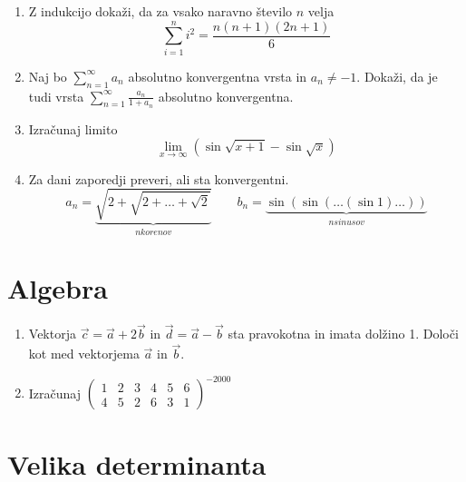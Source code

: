 \documentclass[a4paper,12pt]{article}
\begin{document}
\begin{enumerate}
\item
Z indukcijo dokaži, da za vsako naravno število \(n\) velja
\[
\sum_{i=1}^{n}i^2 = \frac{n(n+1)(2n+1)}{6}
\]

\item
Naj bo $\sum_{n=1}^{\infty}a_n$ absolutno konvergentna vrsta in \(a_n \ne -1\).
Dokaži, da je tudi vrsta \(\sum_{n=1}^\infty \frac{a_n}{1+a_n}\)
absolutno konvergentna.

\item
Izračunaj limito
\[
\lim_{x \to \infty}(\sin\sqrt{x+1} - \sin\sqrt{x})
\]

\item
Za dani zaporedji preveri, ali sta konvergentni.
\[ a_n = \underbrace{\sqrt{2+\sqrt{2+\dots+\sqrt{2}}}}_{n korenov} \qquad
 b_n = \underbrace{\sin(\sin(\dots(\sin 1)\dots))}_{n sinusov}
 \]
\end{enumerate}

\section*{Algebra}

\begin{enumerate}
\item
Vektorja $\vec{c}=\vec{a} + 2\vec{b}$ in $\vec{d}=\vec{a}-\vec{b}$
sta pravokotna in imata dolžino 1. Določi kot med vektorjema \(\vec{a}\) in \(\vec{b}\).

\item
Izračunaj
$
\left(
\begin{array}{cccccc}
1 & 2 & 3 & 4 & 5 & 6 \\
4 & 5 & 2 & 6 & 3 & 1
\end{array}
\right)^{-2000}
$
\end{enumerate}

\section*{Velika determinanta}
\end{document}
